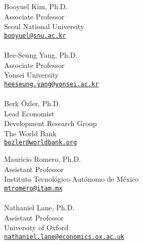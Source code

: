 \documentclass[10pt,article,oneside,a4paper]{memoir}
\begin{document}
\noindent
\begin{minipage}[t]{.5\textwidth}
  \raggedright
  Booyuel Kim, Ph.D.        \\
  Associate Professor       \\
  Seoul National University \\
  \texttt{\href{mailto:booyuel@snu.ac.kr}{booyuel@snu.ac.kr}}  \\
  ~~                        \\
  Hee-Seung Yang, Ph.D.     \\
  Associate Professor       \\
  Yonsei University         \\
  \texttt{\href{mailto:heeseung.yang@yonsei.ac.kr}{heeseung.yang@yonsei.ac.kr}}  \\
  ~~                        \\
  Berk Özler, Ph.D.         \\
  Lead Economist              \\
  Development Research Group  \\
  The World Bank            \\
  \texttt{\href{mailto:bozler@worldbank.org}{bozler@worldbank.org}}  
\end{minipage}%
\begin{minipage}[t]{.7\textwidth}
\raggedright
  Mauricio Romero, Ph.D.    \\
  Assistant Professor       \\
  Instituto Tecnológico Autónomo de México \\
  \texttt{\href{mailto:mtromero@itam.mx}{mtromero@itam.mx}}          \\
  ~~                        \\
  Nathaniel Lane, Ph.D.     \\
  Assistant Professor       \\
  University of Oxford      \\
  \texttt{\href{mailto:nathaniel.lane@economics.ox.ac.uk}{nathaniel.lane@economics.ox.ac.uk}} 
\end{minipage}
\end{document}
